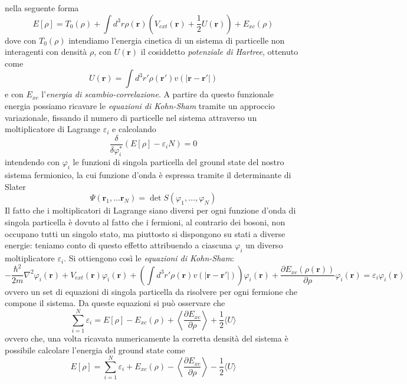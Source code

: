 \documentclass[11pt,a4paper]{article}
\begin{document}
nella seguente forma
\begin{equation}
E[\rho] = T_0(\rho) + \int d^3r \rho(\textbf{r}) \left( V_{ext}(\textbf{r})+\frac{1}{2}U(\textbf{r}) \right) + E_{xc}(\rho)
\end{equation}
dove con $T_0(\rho)$ intendiamo l'energia cinetica di un sistema di particelle non interagenti con densità $\rho$, con $U(\textbf{r})$ il cosiddetto \emph{potenziale di Hartree}, ottenuto come
\[
U(\textbf{r}) = \int d^3r' \rho(\textbf{r}')v(|\textbf{r}-\textbf{r}'|)
\]
e con $E_{xc}$ l'\emph{energia di scambio-correlazione}. A partire da questo funzionale energia possiamo ricavare le \emph{equazioni di Kohn-Sham} tramite un approccio variazionale, fissando il numero di particelle nel sistema attraverso un moltiplicatore di Lagrange $\varepsilon_i$ e calcolando
\begin{equation}
\frac{\delta}{\delta \varphi_i^*} ( E[\rho] - \varepsilon_i N) = 0
\end{equation}
intendendo con $\varphi_i$ le funzioni di singola particella del ground state del nostro sistema fermionico, la cui funzione d'onda è espressa tramite il determinante di Slater
\[
\Psi(\textbf{r}_1,\ldots \textbf{r}_N) = \det S(\varphi_1, \ldots , \varphi_N)
\]
Il fatto che i moltiplicatori di Lagrange siano diversi per ogni funzione d'onda di singola particella è dovuto al fatto che i fermioni, al contrario dei bosoni, non occupano tutti un singolo stato, ma piuttosto si dispongono su stati a diverse energie: teniamo conto di questo effetto attribuendo a ciascuna $\varphi_i$ un diverso moltiplicatore $\varepsilon_i$. Si ottiengono così le \emph{equazioni di Kohn-Sham}:
\begin{equation}
-\frac{\hbar^2}{2m}\nabla^2\varphi_i(\textbf{r}) + V_{ext}(\textbf{r})\varphi_i(\textbf{r}) + \left( \int d^3r' \rho(\textbf{r})v(|\textbf{r}-\textbf{r}'|) \right)\varphi_i(\textbf{r}) + \frac{\partial E_{xc}(\rho(\textbf{r}))}{\partial \rho}\varphi_i(\textbf{r}) = \varepsilon_i \varphi_i(\textbf{r})
\end{equation} 
ovvero un set di equazioni di singola particella da risolvere per ogni fermione che compone il sistema. Da queste equazioni si può osservare che
\[
\sum_{i=1}^N \varepsilon_i = E[\rho] - E_{xc}(\rho) + \left\langle \frac{\partial E_{xc}}{\partial \rho} \right\rangle + \frac{1}{2}\langle U \rangle
\]
ovvero che, una volta ricavata numericamente la corretta densità del sistema è possibile calcolare l'energia del ground state come
\begin{equation}\label{7}
E[\rho] = \sum_{i=1}^N \varepsilon_i + E_{xc}(\rho) - \left\langle \frac{\partial E_{xc}}{\partial \rho} \right\rangle - \frac{1}{2}\langle U \rangle
\end{equation}
\end{document}
